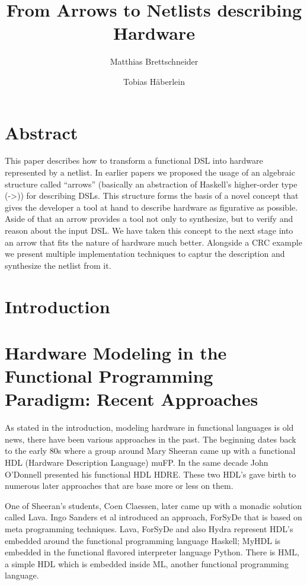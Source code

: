 \documentclass[a4paper,UKenglish]{lipics}
\title{From Arrows to Netlists describing Hardware}
\author[1]{Matthias Brettschneider}
\author[2]{Tobias Häberlein}
\affil[1]{University of Applied Science  \\ Albstadt - Sigmaringen \\ brettschneider@hs-albsig.de}
\affil[2]{University of Applied Science  \\ Albstadt - Sigmaringen \\ haeberlein@hs-albsig.de}
\begin{document}
\section{Abstract}
This paper describes how to transform a functional DSL into hardware represented by a netlist. In earlier papers we proposed the
usage of an algebraic structure called ``arrows'' (basically an abstraction of Haskell's higher-order type (->)) for describing
DSLs. This structure forms the basis of a novel concept that gives the developer a tool at hand to describe hardware as figurative
as possible. Aside of that an arrow provides a tool not only to synthesize, but to verify and reason about the input DSL. We have
taken this concept to the next stage into an arrow that fits the nature of hardware much better. Alongside a CRC example we
present multiple implementation techniques to captur the description and synthesize the netlist from it.



\section{Introduction}

\section{Hardware Modeling in the Functional Programming Paradigm: Recent Approaches}
\label{recent_approaches}
As stated in the introduction, modeling hardware in functional languages is old news, there have been various approaches in the
past. The beginning dates back to the early 80s where a group around Mary Sheeran came up with a functional HDL (Hardware
Description Language) muFP\cite{sheeran:muFP}. In the same decade John O'Donnell presented his functional HDL
HDRE\cite{hydra:old,donnell}. These two HDL's gave birth to numerous later approaches that are base more or less on them.

One of Sheeran's students, Coen Claessen, later came up with a monadic solution called Lava\cite{claessen:hardware}. Ingo Sanders
et al introduced an approach, ForSyDe \cite{forsyde:phd,forsyde:ieee} that is based on meta programming techniques. Lava, ForSyDe
and also Hydra \cite{donnell} represent HDL's embedded around the functional programming language Haskell; MyHDL \cite{myhdl} is
embedded in the functional flavored interpreter language Python. There is HML\cite{hml}, a simple HDL which is embedded inside ML,
another functional programming language.
\end{document}
